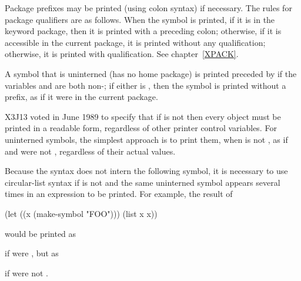 \begin{flushdesc}
Package prefixes may be printed (using colon syntax)
if necessary.
The rules for package qualifiers are as follows.
When the symbol is printed, if it is in the
keyword package, then it is printed with a preceding colon; otherwise, if
it is accessible in the current package, it is printed without any
qualification; otherwise, it is printed with qualification.
See chapter~\ref{XPACK}.

\begin{obsolete}
A symbol that is uninterned (has no home package) is printed
preceded by \cd{\#:} if the variables 
and  are both non-{\nil};
if either is {\nil}, then the symbol is printed without
a prefix, as if it were in the current package.
\end{obsolete}
\begin{newer}
X3J13 voted in June 1989  to specify that if 
is not {\false} then every object must be printed in a readable form,
regardless of other printer control variables.  For uninterned symbols, the simplest approach
is to print them, when  is not {\false}, as if 
and 
were not {\false}, regardless of their actual values.
\end{newer}

\beforenoterule
\begin{implementation}
Because the \cd{\#:} syntax does not intern the
following symbol, it is necessary to use circular-list syntax
if  is not {\false} and
the same uninterned symbol appears several times in an expression
to be printed.  For example, the result of
\begin{lisp}
(let ((x (make-symbol "FOO"))) (list x x))
\end{lisp}
would be printed as
\begin{lisp}
\end{lisp}
if 
were {\false}, but as
\begin{lisp}
\end{lisp}
if 
were not {\false}.
\end{implementation}
\afternoterule


\end{flushdesc}
